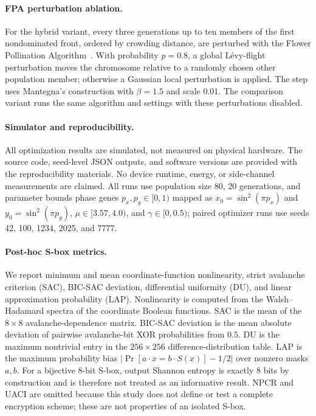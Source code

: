 \documentclass[11pt,a4paper]{article}
\begin{document}
\paragraph{FPA perturbation ablation.}
For the hybrid variant, every three generations up to ten members of
the first nondominated front, ordered by crowding distance, are
perturbed with the Flower Pollination Algorithm~\cite{yang2012flowerpollination}.
With probability $p=0.8$, a global Lévy-flight perturbation moves the
chromosome relative to a randomly chosen other population member;
otherwise a Gaussian local perturbation is applied. The step uses
Mantegna's construction with $\beta=1.5$ and scale 0.01. The
comparison variant runs the same algorithm and settings with these
perturbations disabled.

\paragraph{Simulator and reproducibility.}
All optimization results are simulated, not measured on physical
hardware. The source code, seed-level JSON outputs, and software
versions are provided with the reproducibility materials. No device
runtime, energy, or side-channel measurements are claimed. All runs
use population size 80, 20 generations, and parameter bounds
phase genes $p_x,p_y\in[0,1)$ mapped as $x_0=\sin^2(\pi p_x)$ and $y_0=\sin^2(\pi p_y)$, $\mu\in[3.57,4.0)$, and $\gamma\in[0,0.5)$;
paired optimizer runs use seeds 42, 100, 1234, 2025, and 7777.

\paragraph{Post-hoc S-box metrics.}
We report minimum and mean coordinate-function nonlinearity,
strict avalanche criterion (SAC), BIC-SAC deviation, differential
uniformity (DU), and linear approximation probability (LAP).
Nonlinearity is computed from the Walsh--Hadamard spectra of the
coordinate Boolean functions. SAC is the mean of the $8\times8$
avalanche-dependence matrix. BIC-SAC deviation is the mean absolute
deviation of pairwise avalanche-bit XOR probabilities from $0.5$.
DU is the maximum nontrivial entry in the $256\times256$
difference-distribution table. LAP is the maximum probability bias
$|\Pr[a\cdot x=b\cdot S(x)]-1/2|$ over nonzero masks $a,b$.
For a bijective 8-bit S-box, output Shannon entropy is exactly 8 bits
by construction and is therefore not treated as an informative result.
NPCR and UACI are omitted because this study does not define or test
a complete encryption scheme; these are not properties of an isolated
S-box.
\end{document}
